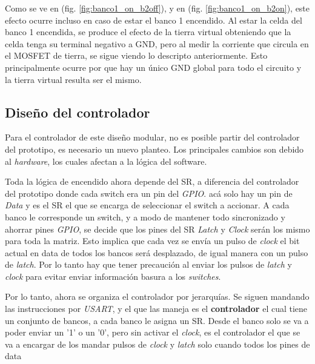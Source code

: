 Como se ve en (fig. \ref{fig:banco1_on_b2off}), y en (fig. \ref{fig:banco1_on_b2on}), este efecto ocurre incluso en caso de estar el banco 1 encendido. Al estar la celda del banco 1 encendida, se produce el efecto de la tierra virtual obteniendo que la celda tenga su terminal negativo a GND, pero al medir la corriente que circula en el MOSFET de tierra, se sigue viendo lo descripto anteriormente. Esto principalmente ocurre por que hay un único GND global para todo el circuito y la tierra virtual resulta ser el mismo. 





\subsection{Diseño del controlador}

Para el controlador de este diseño modular, no es posible partir del controlador del prototipo, es necesario un nuevo planteo. Los principales cambios son debido al \textit{hardware}, los cuales afectan a la lógica del software. 

Toda la lógica de encendido ahora depende del SR, a diferencia del controlador del prototipo donde cada switch era un pin del \textit{GPIO}. acá solo hay un pin de \textit{Data} y es el SR el que se encarga de seleccionar el switch a accionar. A cada banco le corresponde un switch, y a modo de mantener todo sincronizado y ahorrar pines \textit{GPIO}, se decide que los pines del SR \textit{Latch} y \textit{Clock} serán los mismo para toda la matriz. Esto implica que cada vez se envía un pulso de \textit{clock} el bit actual en data de todos los bancos será desplazado, de igual manera con un pulso de \textit{latch}. Por lo tanto hay que tener precaución  al enviar los pulsos de \textit{latch} y \textit{clock} para evitar enviar información basura a los \textit{switches}.

Por lo tanto, ahora se organiza el controlador por jerarquías. Se siguen mandando las instrucciones por \textit{USART}, y el que las maneja es el \textbf{controlador} el cual tiene un conjunto de bancos, a cada banco le asigna un SR. Desde el banco solo se va a poder enviar un '1' o un '0', pero sin activar el \textit{clock}, es el controlador el que se va a encargar de los mandar pulsos de \textit{clock} y \textit{latch} solo cuando todos los pines de data
